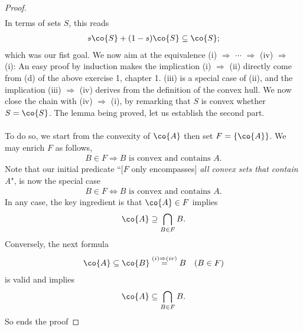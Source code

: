 \begin{proof}
\begin{align}
\end{align}
%
In terms of sets $S$, this reads %
\begin{align}
  s\co{S} + (1-s)\co{S} \subseteq \co{S}; 
\end{align}
which was our fist goal. %
We now aim at the equivalence %
%
(i) $\Rightarrow$ $\cdots$ $\Rightarrow$ (iv) $\Rightarrow$ (i): %
%
An easy proof by induction makes the implication (i) $\Rightarrow$ (ii) %
directly come from (d) of the above exercise 1, chapter 1. %
%
(iii) is a special case of (ii),
and the implication (iii) $\Rightarrow$ (iv) derives from the definition of %
the convex hull. %
%
We now close the chain with (iv) $\Rightarrow$ (i), %
by remarking that $S$ is convex whether $S = \co{S}$. %
%  
The lemma being proved, let us establish the second part. \\
\\
To do so, we start from the convexity of $\co{A}$ then set %
%
  $F = \{\co{A}\}$. %
%
We may enrich $F$ as follows,  %
\begin{align}
  B \in F \Rightarrow B \text{ is convex and contains }A.
\end{align}
Note that our initial predicate %
``[$F$ only encompasses] \textit{all convex sets that contain A}", %
is now the special case %
%
\begin{align}
  B \in F \Leftrightarrow B \text{ is convex and contains }A.
\end{align}
%
In any case, the key ingredient is that $\co{A} \in F$ implies %
%
\begin{align}
 \co{A} \supseteq  \bigcap_{B \in F} B.
\end{align}
%
Conversely, the next formula %
%
\begin{align}
  \co{A} \subseteq \co{B} \overset{(i) \Rightarrow (iv)}{=} B \quad (B \in F) 
\end{align}
%
is valid and implies %
\begin{align}
  \co{A} \subseteq \bigcap_{B \in F} B. 
\end{align}
%
So ends the proof
\end{proof}
